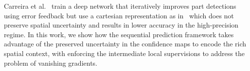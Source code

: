 \documentclass[10pt,twocolumn,letterpaper]{article}
\newcommand\myworries[1]{\textcolor{red}{#1}}
\begin{document}
Carreira et al.~\cite{carreia2015human} train a deep network that iteratively improves part detections using error feedback but use a cartesian representation as in~\cite{toshev2013deeppose} which does not preserve spatial uncertainty and results in lower accuracy in the high-precision regime.
In this work, we show how the sequential prediction framework takes advantage of the preserved uncertainty in the confidence maps to encode the rich spatial context, with enforcing the intermediate local supervisions to address the problem of vanishing gradients.

\end{document}
